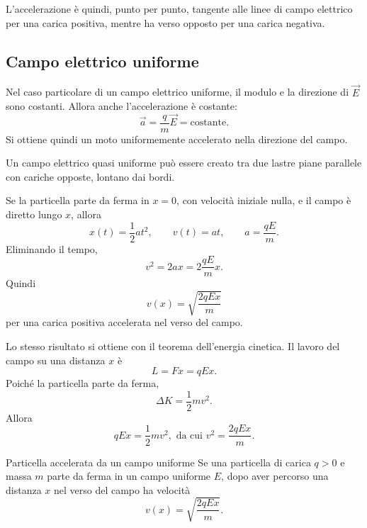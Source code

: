 \documentclass[a4paper]{article}
\begin{document}
L'accelerazione è quindi, punto per punto, tangente alle linee di campo elettrico per una carica positiva, mentre ha verso opposto per una carica negativa.

\subsection{Campo elettrico uniforme}

Nel caso particolare di un campo elettrico uniforme, il modulo e la direzione di \(\vec{E}\) sono costanti. Allora anche l'accelerazione è costante:
\[
    \vec{a}=\frac{q}{m}\vec{E}=\text{costante}.
\]
Si ottiene quindi un moto uniformemente accelerato nella direzione del campo.

Un campo elettrico quasi uniforme può essere creato tra due lastre piane parallele con cariche opposte, lontano dai bordi.

\begin{center}
\end{center}

Se la particella parte da ferma in \(x=0\), con velocità iniziale nulla, e il campo è diretto lungo \(x\), allora
\[
    x(t)=\frac{1}{2}at^2,
    \qquad
    v(t)=at,
    \qquad
    a=\frac{qE}{m}.
\]
Eliminando il tempo,
\[
    v^2=2ax=2\frac{qE}{m}x.
\]
Quindi
\[
    v(x)=\sqrt{\frac{2qEx}{m}}
\]
per una carica positiva accelerata nel verso del campo.

Lo stesso risultato si ottiene con il teorema dell'energia cinetica. Il lavoro del campo su una distanza \(x\) è
\[
    L=Fx=qEx.
\]
Poiché la particella parte da ferma,
\[
    \Delta K=\frac{1}{2}mv^2.
\]
Allora
\[
    qEx=\frac{1}{2}mv^2,
    \text{ da cui }
    v^2=\frac{2qEx}{m}.
\]

\begin{snippetexample}{Particella accelerata da un campo uniforme}
    Se una particella di carica \(q>0\) e massa \(m\) parte da ferma in un campo uniforme \(E\), dopo aver percorso una distanza \(x\) nel verso del campo ha velocità
    \[
        v(x)=\sqrt{\frac{2qEx}{m}}.
    \]
\end{snippetexample}
\end{document}
